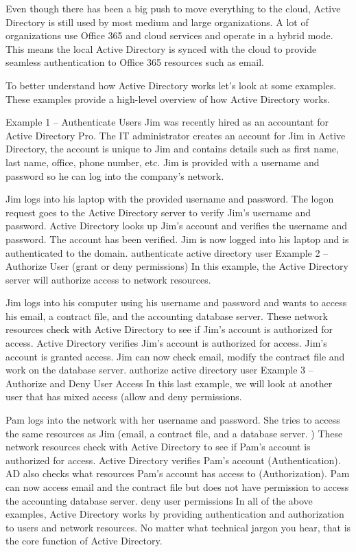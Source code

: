 {Even though there has been a big push to move everything to the cloud, Active Directory is still used by most medium and large organizations. A lot of organizations use Office 365 and cloud services and operate in a hybrid mode. This means the local Active Directory is synced with the cloud to provide seamless authentication to Office 365 resources such as email.

To better understand how Active Directory works let’s look at some examples. These examples provide a high-level overview of how Active Directory works.

Example 1 – Authenticate Users
Jim was recently hired as an accountant for Active Directory Pro. The IT administrator creates an account for Jim in Active Directory, the account is unique to Jim and contains details such as first name, last name, office, phone number, etc. Jim is provided with a username and password so he can log into the company’s network.

Jim logs into his laptop with the provided username and password.
The logon request goes to the Active Directory server to verify Jim’s username and password.
Active Directory looks up Jim’s account and verifies the username and password. The account has been verified.
Jim is now logged into his laptop and is authenticated to the domain.
authenticate active directory user
Example 2 – Authorize User (grant or deny permissions)
In this example, the Active Directory server will authorize access to network resources.

Jim logs into his computer using his username and password and wants to access his email, a contract file, and the accounting database server.
These network resources check with Active Directory to see if Jim’s account is authorized for access.
Active Directory verifies Jim’s account is authorized for access.
Jim’s account is granted access. Jim can now check email, modify the contract file and work on the database server.
authorize active directory user
Example 3 – Authorize and Deny User Access
In this last example, we will look at another user that has mixed access (allow and deny permissions.

Pam logs into the network with her username and password. She tries to access the same resources as Jim (email, a contract file, and a database server. )
These network resources check with Active Directory to see if Pam’s account is authorized for access.
Active Directory verifies Pam’s account (Authentication). AD also checks what resources Pam’s account has access to (Authorization).
Pam can now access email and the contract file but does not have permission to access the accounting database server.
deny user permissions
In all of the above examples, Active Directory works by providing authentication and authorization to users and network resources. No matter what technical jargon you hear, that is the core function of Active Directory.

}
